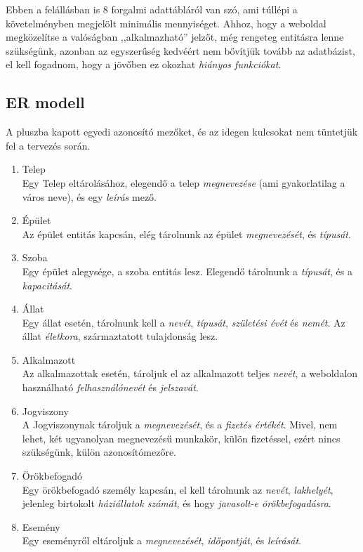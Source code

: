 \documentclass[a4paper,12pt]{article}
\begin{document}
Ebben a felállásban is 8 forgalmi adattábláról van szó, ami túllépi a követelményben megjelölt minimális mennyiséget. Ahhoz, hogy a weboldal megközelítse a valóságban ,,alkalmazható'' jelzőt, még rengeteg entitásra lenne szükségünk, azonban az egyszerűség kedvéért nem bővítjük tovább az adatbázist, el kell fogadnom, hogy a jövőben ez okozhat \textit{hiányos funkciókat}.


\subsection{ER modell}
A pluszba kapott egyedi azonosító mezőket, és az idegen kulcsokat nem tüntetjük fel a tervezés során.

\begin{enumerate}
	\item Telep \\
	Egy Telep eltárolásához, elegendő a telep \textit{megnevezése} (ami gyakorlatilag a város neve), és egy \textit{leírás} mező.
	
	\item Épület \\
	Az épület entitás kapcsán, elég tárolnunk az épület \textit{megnevezését}, és \textit{típusát}.
	
	\item Szoba \\
	Egy épület alegysége, a szoba entitás lesz. Elegendő tárolnunk a \textit{típusát}, és a \textit{kapacitását}.
	
	\item Állat \\
	Egy állat esetén, tárolnunk kell a \textit{nevét}, \textit{típusát}, \textit{születési évét} és \textit{nemét}. Az állat \textit{életkora}, származtatott tulajdonság lesz.
	
	\item Alkalmazott \\
	Az alkalmazottak esetén, tároljuk el az alkalmazott teljes \textit{nevét}, a weboldalon használható \textit{felhasználónevét} és \textit{jelszavát}.
	
	\item Jogviszony \\
	A Jogviszonynak tároljuk a \textit{megnevezését}, és a \textit{fizetés értékét}. Mivel, nem lehet, két ugyanolyan megnevezésű munkakör, külön fizetéssel, ezért nincs szükségünk, külön azonosítómezőre. 
	
	\item Örökbefogadó \\
	Egy örökbefogadó személy kapcsán, el kell tárolnunk az \textit{nevét}, \textit{lakhelyét}, jelenleg birtokolt \textit{háziállatok számát},  és hogy \textit{javasolt-e örökbefogadásra}.
	
	\item Esemény \\
	Egy eseményről eltároljuk a \textit{megnevezését}, \textit{időpontját}, és \textit{leírását}.
\end{enumerate}
\end{document}
